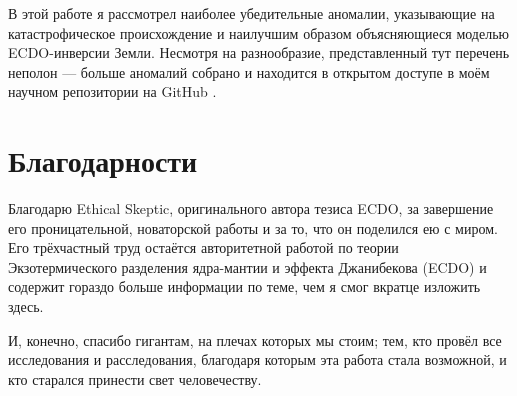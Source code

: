 \documentclass[10pt,twocolumn,letterpaper]{article}
\begin{document}
В этой работе я рассмотрел наиболее убедительные аномалии, указывающие на катастрофическое происхождение и наилучшим образом объясняющиеся моделью ECDO-инверсии Земли. Несмотря на разнообразие, представленный тут перечень неполон — больше аномалий собрано и находится в открытом доступе в моём научном репозитории на GitHub \cite{2}.

\section{Благодарности}

Благодарю Ethical Skeptic, оригинального автора тезиса ECDO, за завершение его проницательной, новаторской работы и за то, что он поделился ею с миром. Его трёхчастный труд \cite{1} остаётся авторитетной работой по теории Экзотермического разделения ядра-мантии и эффекта Джанибекова (ECDO) и содержит гораздо больше информации по теме, чем я смог вкратце изложить здесь.

И, конечно, спасибо гигантам, на плечах которых мы стоим; тем, кто провёл все исследования и расследования, благодаря которым эта работа стала возможной, и кто старался принести свет человечеству.

\clearpage
\twocolumn

{\small


}
\end{document}
